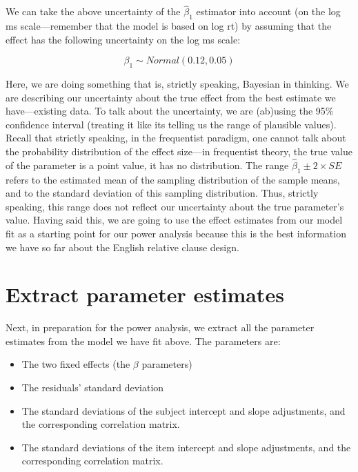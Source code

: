 \documentclass[12pt,]{krantz}
\providecommand{\tightlist}{%
  \setlength{\itemsep}{0pt}\setlength{\parskip}{0pt}}
\begin{document}
We can take the above uncertainty of the \(\hat\beta_1\) estimator into account (on the log ms scale---remember that the model is based on log rt) by assuming that the effect has the following uncertainty on the log ms scale:

\begin{equation}
\beta_1 \sim Normal(0.12,0.05)
\end{equation}

Here, we are doing something that is, strictly speaking, Bayesian in thinking. We are describing our uncertainty about the true effect from the best estimate we have---existing data. To talk about the uncertainty, we are (ab)using the 95\% confidence interval (treating it like its telling us the range of plausible values). Recall that strictly speaking, in the frequentist paradigm, one cannot talk about the probability distribution of the effect size---in frequentist theory, the true value of the parameter is a point value, it has no distribution. The range \(\hat\beta_1 \pm 2\times SE\) refers to the estimated mean of the sampling distribution of the sample means, and to the standard deviation of this sampling distribution. Thus, strictly speaking, this range does not reflect our uncertainty about the true parameter's value. Having said this, we are going to use the effect estimates from our model fit as a starting point for our power analysis because this is the best information we have so far about the English relative clause design.

\hypertarget{extract-parameter-estimates}{%
\section{Extract parameter estimates}\label{extract-parameter-estimates}}

Next, in preparation for the power analysis, we extract all the parameter estimates from the model we have fit above. The parameters are:

\begin{itemize}
\tightlist
\item
  The two fixed effects (the \(\beta\) parameters)
\item
  The residuals' standard deviation
\item
  The standard deviations of the subject intercept and slope adjustments, and the corresponding correlation matrix.
\item
  The standard deviations of the item intercept and slope adjustments, and the corresponding correlation matrix.
\end{itemize}
\end{document}
